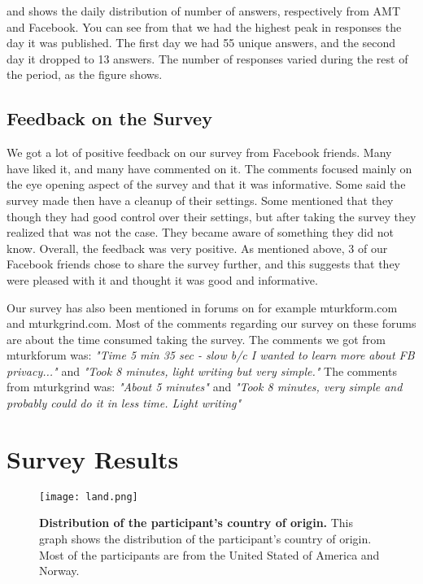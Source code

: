  and  shows the daily distribution of number of answers, respectively from AMT and Facebook. You can see from  that we had the highest peak in responses the day it was published. The first day we had 55 unique answers, and the second day it dropped to 13 answers. The number of responses varied during the rest of the period, as the figure shows. 

\subsection{Feedback on the Survey}
We got a lot of positive feedback on our survey from Facebook friends. Many have liked it, and many have commented on it. The comments focused mainly on the eye opening aspect of the survey and that it was informative. Some said the survey made then have a cleanup of their settings. Some mentioned that they though they had good control over their settings, but after taking the survey they realized that was not the case. They became aware of something they did not know. Overall, the feedback was very positive. As mentioned above, 3 of our Facebook friends chose to share the survey further, and this suggests that they were pleased with it and thought it was good and informative. 

Our survey has also been mentioned in forums on for example mturkform.com and mturkgrind.com. Most of the comments regarding our survey on these forums are about the time consumed taking the survey. The comments we got from mturkforum was: \textit{"Time 5 min 35 sec - slow b/c I wanted to learn more about FB privacy..."} and \textit{"Took 8 minutes, light writing but very simple."}
The comments from mturkgrind was: \textit{"About 5 minutes"} and \textit{"Took 8 minutes, very simple and probably could do it in less time. Light writing"}


\section{Survey Results}

\begin{figure}[h!]
\centering
\texttt{[image: land.png]}
\caption[Distribution of the participant's country of origin]{\textbf{Distribution of the participant's country of origin.} This graph shows the distribution of the participant's country of origin. Most of the participants are from the United Stated of America and Norway.} 
\label{fig:land}
\end{figure}


